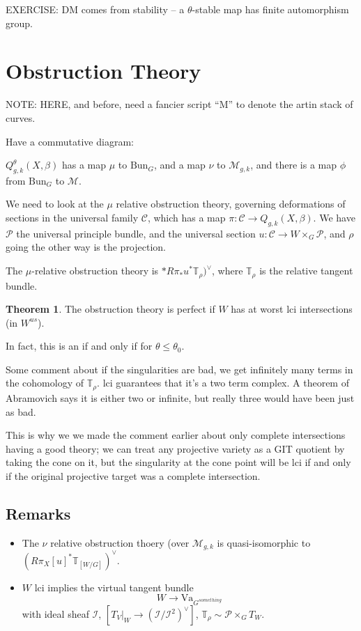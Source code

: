 \documentclass{amsart}
\theoremstyle{definition}
\newtheorem{theorem}[dummy]{Theorem}
\newcommand{\TT}{\mathbb{T}}
\newcommand{\M}{\mathcal{M}}
\begin{document}
EXERCISE: DM comes from stability -- a $\theta$-stable map has finite automorphism group.

\section{Obstruction Theory}
NOTE: HERE, and before, need a fancier script ``M'' to denote the artin stack of curves.

Have a commutative diagram:

$Q^\theta_{g,k}(X,\beta)$ has a map $\mu$ to $\text{Bun}_G$, and a map $\nu$ to $\M_{g,k}$, and there is a map $\phi$ from $\text{Bun}_G$ to $\M$.

We need to look at the $\mu$ relative obstruction theory, governing deformations of sections in the universal family $\mathcal{C}$, which has a map $\pi:\mathcal{C}\to Q_{g,k}(X,\beta)$.  We have $\mathcal{P}$ the universal principle bundle, and the universal section $u:\mathcal{C}\to W\times_G\mathcal{P}$, and $\rho$ going the other way is the projection.

The $\mu$-relative obstruction theory is $*R\pi_* u^* \TT_\rho)^\vee$, where $\TT_\rho$ is the relative tangent bundle.

\begin{theorem}
The obstruction theory is perfect if $W$ has at worst lci intersections (in $W^{us}$).  

In fact, this is an if and only if for $\theta\leq \theta_0$.
\end{theorem}

Some comment about if the singularities are bad, we get infinitely many terms in the cohomology of $\TT_\rho$.  lci guarantees that it's a two term complex.  A theorem of Abramovich says it is either two or infinite, but really three would have been just as bad.

This is why we we made the comment earlier about only complete intersections having a good theory; we can treat any projective variety as a GIT quotient by taking the cone on it, but the singularity at the cone point will be lci if and only if the original projective target was a complete intersection.

\subsection{Remarks}

\begin{itemize}
\item The $\nu$ relative obstruction thoery (over $\M_{g,k}$ is quasi-isomorphic to $(R\pi_X[u]^*\TT_{[W/G]})^\vee$.
\item $W$ lci implies the virtual tangent bundle
$$W\to \text{Va}_{G^{something}}$$ with ideal sheaf $\mathcal{I}$, $[T_V|_W\to (\mathcal{I}/\mathcal{I}^2)^\vee]$, $\TT_\rho\sim\mathcal{P}\times_G T_W$.
\end{itemize}
\end{document}
